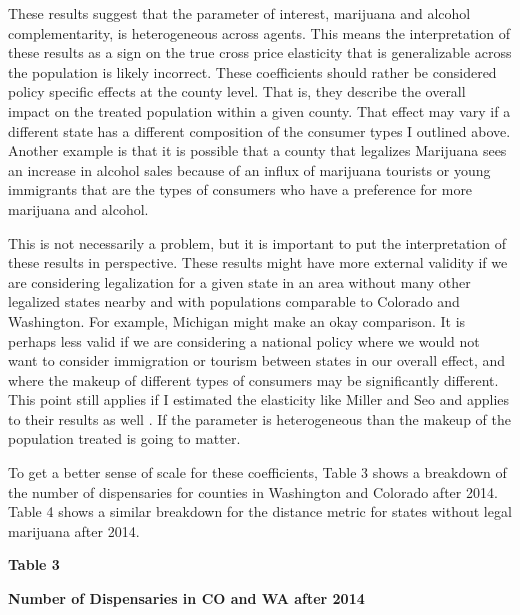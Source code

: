 \documentclass[11pt]{article}
\begin{document}
These results suggest that the parameter of interest, marijuana and alcohol complementarity, is heterogeneous across agents. This means the interpretation of these results as a sign on the true cross price elasticity that is generalizable across the population is likely incorrect. These coefficients should rather be considered policy specific effects at the county level. That is, they describe the overall impact on the treated population within a given county. That effect may vary if a different state has a different composition of the consumer types I outlined above. Another example is that it is possible that a county that legalizes Marijuana sees an increase in alcohol sales because of an influx of marijuana tourists or young immigrants that are the types of consumers who have a preference for more marijuana and alcohol. \par 

This is not necessarily a problem, but it is important to put the interpretation of these results in perspective. These results might have more external validity if we are considering legalization for a given state in an area without many other legalized states nearby and with populations comparable to Colorado and Washington. For example, Michigan might make an okay comparison. It is perhaps less valid if we are considering a national policy where we would not want to consider immigration or tourism between states in our overall effect, and where the makeup of different types of consumers may be significantly different. This point still applies if I estimated the elasticity like Miller and Seo and applies to their results as well \cite{miller_seo_2018}. If the parameter is heterogeneous than the makeup of the population treated is going to matter. \par

To get a better sense of scale for these coefficients, Table 3 shows a breakdown of the number of dispensaries for counties in Washington and Colorado after 2014. Table 4 shows a similar breakdown for the distance metric for states without legal marijuana after 2014. 

\begin{center}
	
	\centering
	\LARGE{\textbf{Table 3}}\par\medskip
	
	\normalsize{\textbf{Number of Dispensaries in CO and WA after 2014}}\par\medskip
	\scalebox{.8}{
		
	}
\end{center}
\end{document}
